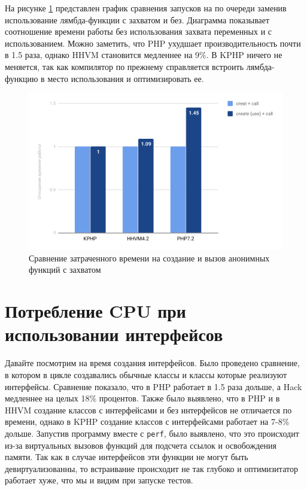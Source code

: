 На рисунке \ref{fig:benchmark-create_use_call-simple} представлен график сравнения запусков на по очереди заменив использование лямбда-функции с захватом и без.
Диаграмма показывает соотношение времени работы без использования захвата переменных и с использованием.
Можно заметить, что PHP ухудшает производительность почти в 1.5 раза, однако HHVM становится медленнее на 9\%.
В KPHP ничего не меняется, так как компилятор по прежнему справляется встроить лямбда-функцию в место использования и оптимизировать ее.
\begin{figure}[H]
    \caption{Сравнение затраченного времени на создание и вызов анонимных функций с захватом}
    \label{fig:benchmark-create_use_call-simple}
    \centering
    \includegraphics[width=\linewidth]{images/benchmark_create_use_call_simple}
\end{figure}

\section{Потребление CPU при использовании интерфейсов}
Давайте посмотрим на время создания интерфейсов.
Было проведено сравнение, в котором в цикле создавались обычные классы и классы которые реализуют интерфейсы.
Сравнение показало, что в PHP работает в 1.5 раза дольше, а Hack медленнее на целых 18\% процентов.
Также было выявлено, что в PHP и в HHVM создание классов с интерфейсами и без интерфейсов не отличается по времени,
однако в KPHP создание классов с интерфейсами работает на 7-8\% дольше.
Запустив программу вместе с \verb|perf|, было выявлено, что это происходит из-за виртуальных вызовов функций для подсчета ссылок и освобождения памяти.
Так как в случае интерфейсов эти функции не могут быть девиртуализованны\cite{devirtualization}, то встраивание происходит не так глубоко и оптимизитатор работает хуже, что мы и видим при запуске тестов.

